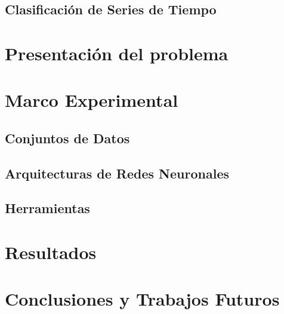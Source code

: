\documentclass[a4paper,12pt,spanish]{book}
\begin{document}
\section{Clasificación de Series de Tiempo}



\chapter{Presentación del problema}



\chapter{Marco Experimental}

\section{Conjuntos de Datos}


\section{Arquitecturas de Redes Neuronales}


\section{Herramientas}



\chapter{Resultados}


\chapter{Conclusiones y Trabajos Futuros}

\newpage
\footnotesize



\newpage
\newpage
\vfill
\addtocounter{page}{-1}
\clearpage
\thispagestyle{empty}
\phantom{a}
\vfill
\newpage
\vfill
\addtocounter{page}{-1}
\end{document}
